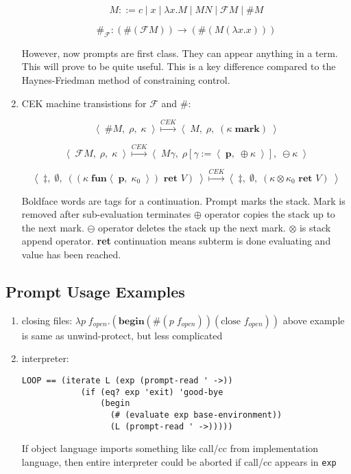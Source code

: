 \documentclass[letterpaper]{llncs}
\newcommand{\F}{ \ensuremath{ \mathcal{F} } }
\newcommand{\cek}[3]{ \ensuremath{ \left\langle \; #1, \; #2, \; #3 \; \right\rangle } }
\newcommand{\labeledstep}[1]{ \ensuremath{ \stackrel{#1}{\longmapsto} } }
\newcommand{\cekstep}{ \ensuremath{ \labeledstep{CEK} } }
\newcommand{\clos}[2]{ \ensuremath{ \left\langle \; #1, \; #2 \; \right\rangle } }
\begin{document}
\begin{enumerate}
	$$M ::= c \mid x \mid \lambda x.M \mid M N \mid \F M \mid \# M$$

	$$\#_\F: (\# (\F M)) \rightarrow (\# (M (\lambda x.x)))$$
	
	However, now prompts are first class. They can appear anything in a term. This will prove to be quite useful. This is a key difference compared to the Haynes-Friedman method of constraining control.
	
	\item CEK machine transistions for $\F$ and \#:
	
	$$\cek{ \# M }{ \rho }{ \kappa } 
	      \cekstep 
	  \cek{ M }{ \rho }{ (\kappa \; \textbf{mark}) }$$
	
	$$\cek{ \F M }{ \rho }{ \kappa } 
	      \cekstep 
	  \cek{ M \gamma }{ \rho[\gamma := \clos{ \textbf{p} }{ \oplus \kappa }] }{ \ominus \kappa }$$
	  
	$$\cek{ \ddagger }{ \emptyset }{ ((\kappa \; \textbf{fun} \clos{\textbf{p}}{\kappa_0}) \textbf{ ret } V) } 
	      \cekstep
	  \cek{ \ddagger }{ \emptyset }{ (\kappa \otimes \kappa_0 \textbf{ ret } V) }$$
	
	Boldface words are tags for a continuation. Prompt marks the stack. Mark is removed after sub-evaluation terminates $\oplus$ operator copies the stack up to the next mark. $\ominus$ operator deletes the stack up the next mark. $\otimes$ is stack append operator. \textbf{ret} continuation means subterm is done evaluating and value has been reached.
	

\end{enumerate}


\subsection*{Prompt Usage Examples}
\begin{enumerate}
	\item closing files: $\lambda p \; f_{open}.(\textbf{begin} (\#(p \; f_{open})) (\textrm{close } f_{open}))$
	above example is same as unwind-protect, but less complicated
	\item interpreter: 
\begin{verbatim}
LOOP == (iterate L (exp (prompt-read ' ->))
	        (if (eq? exp 'exit) 'good-bye
	            (begin
	              (# (evaluate exp base-environment))
	              (L (prompt-read ' ->)))))
\end{verbatim}
If object language imports something like call/cc from implementation language, then entire interpreter could be aborted if call/cc appears in \texttt{exp}
\end{enumerate}
\end{document}
